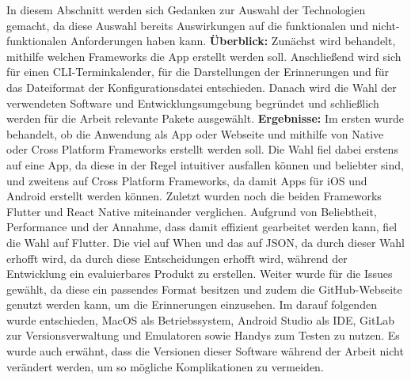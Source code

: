 In diesem Abschnitt werden sich Gedanken zur Auswahl der Technologien gemacht, da diese Auswahl bereits Auswirkungen auf die funktionalen und nicht-funktionalen Anforderungen haben kann.\newline%
\textbf{Überblick:} %
Zunächst wird behandelt, mithilfe welchen Frameworks die App erstellt werden soll. Anschließend wird sich für einen CLI-Terminkalender, für die Darstellungen der Erinnerungen und für das Dateiformat der Konfigurationsdatei entschieden. Danach wird die Wahl der verwendeten Software und Entwicklungsumgebung begründet und schließlich werden für die Arbeit relevante Pakete ausgewählt.\newline%
\textbf{Ergebnisse:} %
	Im ersten  wurde behandelt, ob die Anwendung als App oder Webseite und mithilfe von Native oder Cross Platform Frameworks erstellt werden soll. Die Wahl fiel dabei erstens auf eine App, da diese in der Regel intuitiver ausfallen können und beliebter sind, und zweitens auf Cross Platform Frameworks, da damit Apps für iOS und Android erstellt werden können. Zuletzt wurden noch die beiden Frameworks Flutter und React Native miteinander verglichen. Aufgrund von Beliebtheit, Performance und der Annahme, dass damit effizient gearbeitet werden kann, fiel die Wahl auf Flutter.\newline%
	Die  viel auf When und das  auf JSON, da durch dieser Wahl erhofft wird, da durch diese Entscheidungen erhofft wird, während der Entwicklung ein evaluierbares Produkt zu erstellen.%
	Weiter wurde für die  Issues gewählt, da diese ein passendes Format besitzen und zudem die GitHub-Webseite genutzt werden kann, um die Erinnerungen einzusehen.\newline%
	Im darauf folgenden  wurde entschieden, MacOS als Betriebssystem, Android Studio als IDE, GitLab zur Versionsverwaltung und Emulatoren sowie Handys zum Testen zu nutzen. Es wurde auch erwähnt, dass die Versionen dieser Software während der Arbeit nicht verändert werden, um so mögliche Komplikationen zu vermeiden.\newline%
